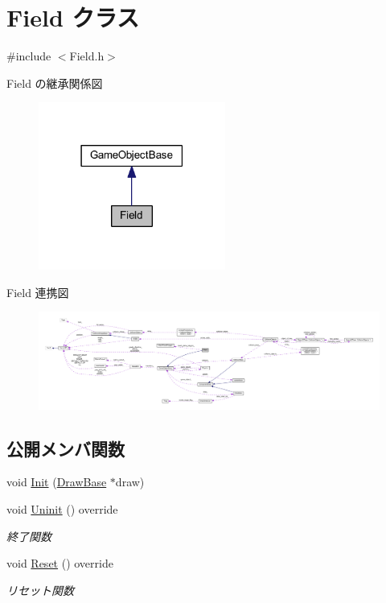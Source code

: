 \hypertarget{class_field}{}\section{Field クラス}
\label{class_field}


{\ttfamily \#include $<$Field.\+h$>$}



Field の継承関係図\nopagebreak
\begin{figure}[H]
\begin{center}
\leavevmode
\includegraphics[width=174pt]{class_field__inherit__graph}
\end{center}
\end{figure}


Field 連携図\nopagebreak
\begin{figure}[H]
\begin{center}
\leavevmode
\includegraphics[width=350pt]{class_field__coll__graph}
\end{center}
\end{figure}
\subsection*{公開メンバ関数}
\begin{DoxyCompactItemize}
\item 
void \mbox{\hyperlink{class_field_a8360ab68eaf346984eab8bce4c37c3b3}{Init}} (\mbox{\hyperlink{class_draw_base}{Draw\+Base}} $\ast$draw)
\item 
void \mbox{\hyperlink{class_field_a6d1015e2409daa87cd00485ac1efc06b}{Uninit}} () override
\begin{DoxyCompactList}\small\item\em 終了関数 \end{DoxyCompactList}\item 
void \mbox{\hyperlink{class_field_a5b140074dcca821ac702da348238c6d4}{Reset}} () override
\begin{DoxyCompactList}\small\item\em リセット関数 \end{DoxyCompactList}\end{DoxyCompactItemize}
